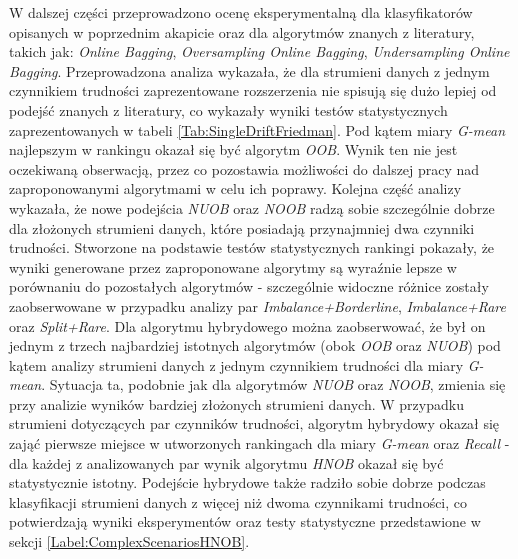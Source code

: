 W dalszej części przeprowadzono ocenę eksperymentalną dla klasyfikatorów opisanych w poprzednim akapicie oraz dla algorytmów znanych z literatury, takich jak: \textit{Online Bagging}, \textit{Oversampling Online Bagging}, \textit{Undersampling Online Bagging}. Przeprowadzona analiza wykazała, że dla strumieni danych z jednym czynnikiem trudności zaprezentowane rozszerzenia nie spisują się dużo lepiej od podejść znanych z literatury, co wykazały wyniki testów statystycznych zaprezentowanych w tabeli \ref{Tab:SingleDriftFriedman}. Pod kątem miary \textit{G-mean} najlepszym w rankingu okazał się być algorytm \textit{OOB}. Wynik ten nie jest oczekiwaną obserwacją, przez co pozostawia możliwości do dalszej pracy nad zaproponowanymi algorytmami w celu ich poprawy. Kolejna część analizy wykazała, że nowe podejścia \textit{NUOB} oraz \textit{NOOB} radzą sobie szczególnie dobrze dla złożonych strumieni danych, które posiadają przynajmniej dwa czynniki trudności. Stworzone na podstawie testów statystycznych rankingi pokazały, że wyniki generowane przez zaproponowane algorytmy są wyraźnie lepsze w porównaniu do pozostałych algorytmów - szczególnie widoczne różnice zostały zaobserwowane w przypadku analizy par \textit{Imbalance+Borderline}, \textit{Imbalance+Rare} oraz \textit{Split+Rare}. Dla algorytmu hybrydowego można zaobserwować, że był on jednym z trzech najbardziej istotnych algorytmów (obok \textit{OOB} oraz \textit{NUOB}) pod kątem analizy strumieni danych z jednym czynnikiem trudności dla miary \textit{G-mean}. Sytuacja ta, podobnie jak dla algorytmów \textit{NUOB} oraz \textit{NOOB}, zmienia się przy analizie wyników bardziej złożonych strumieni danych. W przypadku strumieni dotyczących par czynników trudności, algorytm hybrydowy okazał się zająć pierwsze miejsce w utworzonych rankingach dla miary \textit{G-mean} oraz \textit{Recall} - dla każdej z analizowanych par wynik algorytmu \textit{HNOB} okazał się być statystycznie istotny. Podejście hybrydowe także radziło sobie dobrze podczas klasyfikacji strumieni danych z więcej niż dwoma czynnikami trudności, co potwierdzają wyniki eksperymentów oraz testy statystyczne przedstawione w sekcji \ref{Label:ComplexScenariosHNOB}.

